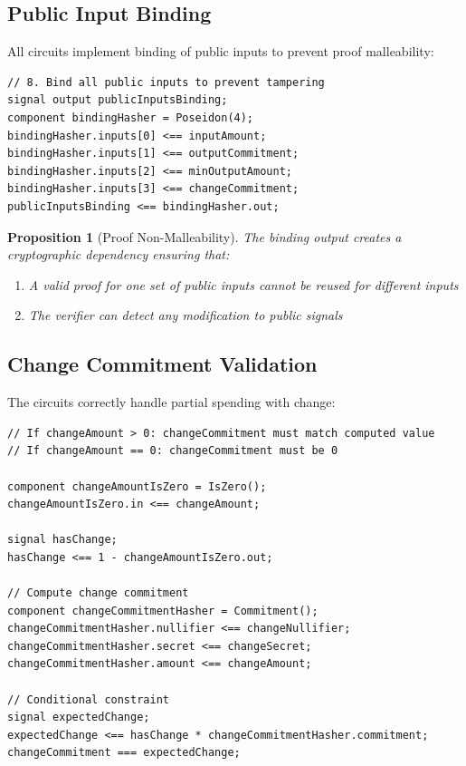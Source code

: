 \documentclass[11pt,a4paper]{article}
\newtheorem{proposition}[theorem]{Proposition}
\begin{document}
\subsection{Public Input Binding}

All circuits implement binding of public inputs to prevent proof malleability:

\begin{lstlisting}[style=circom, caption={Public Input Binding (swap.circom:143-154)}]
// 8. Bind all public inputs to prevent tampering
signal output publicInputsBinding;
component bindingHasher = Poseidon(4);
bindingHasher.inputs[0] <== inputAmount;
bindingHasher.inputs[1] <== outputCommitment;
bindingHasher.inputs[2] <== minOutputAmount;
bindingHasher.inputs[3] <== changeCommitment;
publicInputsBinding <== bindingHasher.out;
\end{lstlisting}

\begin{proposition}[Proof Non-Malleability]
The binding output creates a cryptographic dependency ensuring that:
\begin{enumerate}
    \item A valid proof for one set of public inputs cannot be reused for different inputs
    \item The verifier can detect any modification to public signals
\end{enumerate}
\end{proposition}

\subsection{Change Commitment Validation}

The circuits correctly handle partial spending with change:

\begin{lstlisting}[style=circom, caption={Change Commitment Logic (transfer.circom:99-119)}]
// If changeAmount > 0: changeCommitment must match computed value
// If changeAmount == 0: changeCommitment must be 0

component changeAmountIsZero = IsZero();
changeAmountIsZero.in <== changeAmount;

signal hasChange;
hasChange <== 1 - changeAmountIsZero.out;

// Compute change commitment
component changeCommitmentHasher = Commitment();
changeCommitmentHasher.nullifier <== changeNullifier;
changeCommitmentHasher.secret <== changeSecret;
changeCommitmentHasher.amount <== changeAmount;

// Conditional constraint
signal expectedChange;
expectedChange <== hasChange * changeCommitmentHasher.commitment;
changeCommitment === expectedChange;
\end{lstlisting}
\end{document}
